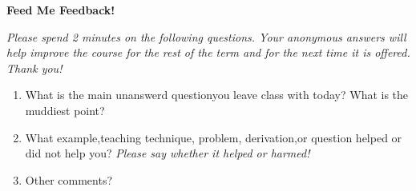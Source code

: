 \documentclass[12pt]{article}
\begin{document}
\mbox{\hspace{1in}}
\vspace{-0.6in}
\thispagestyle{empty}
\begin{center}
{\Huge \bf Feed Me Feedback!}
\end{center}
\Large
\vspace{3ex}


\vspace{3ex}

{\em Please spend 2 minutes on the following questions. Your anonymous answers will help improve the course for the rest of the term and for the next time it is offered. Thank you!}

\vspace{3ex}

\begin{enumerate}
\item What is the main unanswerd questionyou leave class with today? What is the muddiest point?

\vspace{2in}

\item What example,teaching technique, problem, derivation,or question helped or did not help you? {\em Please say whether it helped or harmed!}

\vspace{2in}

\item Other comments?

\end{enumerate}
\end{document}
